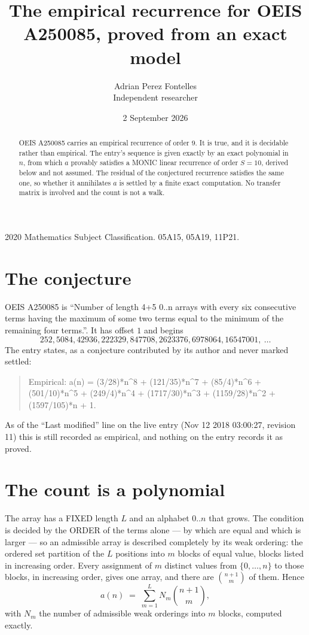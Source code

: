 \documentclass[11pt,a4paper]{article}
\title{The empirical recurrence for OEIS A250085, proved from an exact model}
\author{Adrian Perez Fontelles\\ \small Independent researcher}
\date{2 September 2026}
\theoremstyle{plain}
\theoremstyle{definition}
\begin{document}
\maketitle

\begin{abstract}
OEIS A250085 carries an empirical recurrence of order $9$. It is true, and it is
decidable rather than empirical. The entry's sequence is given exactly by an exact polynomial in $n$, from
which $a$ provably satisfies a MONIC linear recurrence of order $S=10$, derived below and not
assumed. The residual of the conjectured recurrence satisfies the same one, so whether it
annihilates $a$ is settled by a finite exact computation. No transfer matrix is involved and
the count is not a walk.
\end{abstract}

\noindent\small 2020 Mathematics Subject Classification. 05A15, 05A19, 11P21.\normalsize

\section{The conjecture}

OEIS A250085 is ``Number of length 4+5 0..n arrays with every six consecutive terms having the maximum of some two terms equal to the minimum of the remaining four terms.''. It has offset $1$ and begins
\[
252, 5084, 42936, 222329, 847708, 2623376, 6978064, 16547001,\ \dots
\]
The entry states, as a conjecture contributed by its author and never marked settled:
\begin{quote}
Empirical: a(n) = (3/28)*n\^{}8 + (121/35)*n\^{}7 + (85/4)*n\^{}6 + (501/10)*n\^{}5 + (249/4)*n\^{}4 + (1717/30)*n\^{}3 + (1159/28)*n\^{}2 + (1597/105)*n + 1.
\end{quote}
As of the ``Last modified'' line on the live entry (Nov 12 2018 03:00:27, revision 11)
this is still recorded as empirical, and nothing on the entry records it as proved.

\section{The count is a polynomial}

The array has a FIXED length $L$ and an alphabet $0..n$ that grows. The condition is decided by
the ORDER of the terms alone --- by which are equal and which is larger --- so an admissible
array is described completely by its weak ordering: the ordered set partition of the $L$
positions into $m$ blocks of equal value, blocks listed in increasing order. Every assignment
of $m$ distinct values from $\{0,\dots,n\}$ to those blocks, in increasing order, gives one
array, and there are $\binom{n+1}{m}$ of them. Hence
\[
a(n)\;=\;\sum_{m=1}^{L} N_m\binom{n+1}{m},
\]
with $N_m$ the number of admissible weak orderings into $m$ blocks, computed exactly.
\end{document}
